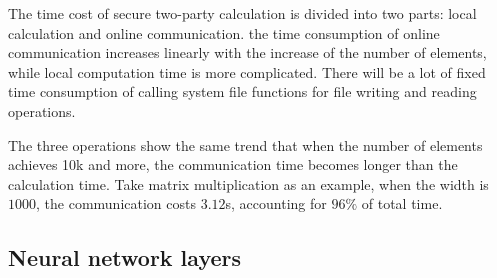 \documentclass[letterpaper]{article} %
\begin{document}
    The time cost of secure two-party calculation is divided into two parts:
    local calculation and online communication.
    the time consumption of online communication increases linearly with the increase of the number of elements,
    while local computation time is more complicated.
    There will be a lot of fixed time consumption of calling system file functions
    for file writing and reading operations.

    The three operations show the same trend that
    when the number of elements achieves 10k and more,
    the communication time becomes longer than the calculation time.
    Take matrix multiplication as an example,
    when the width is $1000$, the communication costs $3.12$s, accounting for $96\%$ of total time.

    \subsection{Neural network layers}
\end{document}
